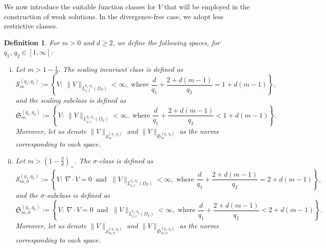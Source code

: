 \documentclass{amsart}
\newtheorem{definition}[defn]{Definition}
\numberwithin{equation}{section}
\begin{document}
We now introduce the suitable function classes for \(V\) that will be employed in the construction of weak solutions. In the divergence-free case, we adopt less restrictive classes.
\begin{definition}\label{Def:V}
For $m>0$ and $d\ge 2$, we define the following spaces, for $q_1, \, q_2 \in [1, \infty]$:
\begin{enumerate}[(i)]
  \item Let $m > 1-\frac{1}{d}$. The scaling invariant class is defined as
	\begin{equation}\label{S}
		\mathcal{S}_{m}^{(q_1, q_2)} := \left\{ V: \ \|V\|_{L_{x,t}^{q_1, q_2}(\Omega_T)} < \infty, \text{ where } \frac{d}{q_1} + \frac{2+d(m-1)}{q_2} = 1+ d(m-1)\right\},
	\end{equation}
	and the scaling subclass is defined as
	\begin{equation}\label{sub_S}
		\mathfrak{S}_{m}^{(q_1, q_2)} := \left\{ V: \ \|V\|_{L_{x,t}^{q_1, q_2}(\Omega_T)} < \infty, \text{ where } \frac{d}{q_1} + \frac{2+d(m-1)}{q_2} < 1+ d(m-1)\right\}.
	\end{equation}
	 Moreover, let us denote $\|V\|_{\mathcal{S}_{m}^{(q_1,q_2)}}$ and $\|V\|_{\mathfrak{S}_{m}^{(q_1, q_2)}}$ as the norms corresponding to each space.
  \item Let $m > (1-\frac{2}{d})_{+}$. The $\sigma$-class is defined as
	\begin{equation}\label{S_divfree}
		\mathcal{S}_{m,\sigma}^{(q_1, q_2)} := \left\{ V: \ \nabla\cdot V = 0 \ \text{ and } \ \|V\|_{L_{x,t}^{q_1, q_2}(\Omega_T)} < \infty, \text{ where } \frac{d}{q_1} + \frac{2+d(m-1)}{q_2} = 2+ d(m-1)\right\},
	\end{equation}
	and the $\sigma$-subclass is defined as
	\begin{equation}\label{sub_S_divfree}
		\mathfrak{S}_{m,\sigma}^{(q_1, q_2)} := \left\{ V: \ \nabla\cdot V = 0 \ \text{ and } \ \|V\|_{L_{x,t}^{q_1, q_2}(\Omega_T)} < \infty, \text{ where } \frac{d}{q_1} + \frac{2+d(m-1)}{q_2} < 2+ d(m-1)\right\}.
	\end{equation}
	Moreover, let us denote $\|V\|_{\mathcal{S}_{m, \sigma}^{(q_1, q_2)}}$ and $\|V\|_{\mathfrak{S}_{m,\sigma}^{(q_1, q_2)}}$ as the norms corresponding to each space.
\end{enumerate}
\end{definition}
\end{document}
